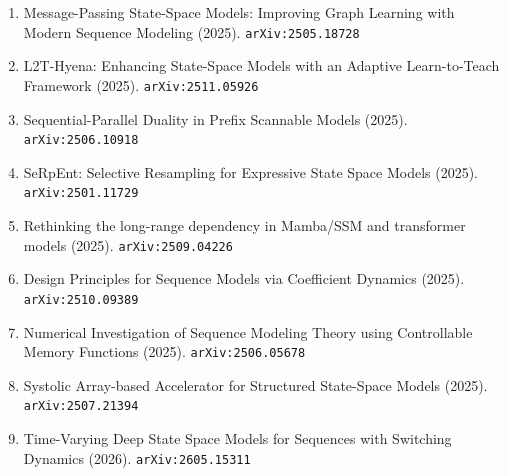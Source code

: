 \documentclass[11pt]{article}
\begin{document}
\begin{enumerate}
  \item Message-Passing State-Space Models: Improving Graph Learning with Modern Sequence Modeling (2025). \texttt{arXiv:2505.18728}
  \item L2T-Hyena: Enhancing State-Space Models with an Adaptive Learn-to-Teach Framework (2025). \texttt{arXiv:2511.05926}
  \item Sequential-Parallel Duality in Prefix Scannable Models (2025). \texttt{arXiv:2506.10918}
  \item SeRpEnt: Selective Resampling for Expressive State Space Models (2025). \texttt{arXiv:2501.11729}
  \item Rethinking the long-range dependency in Mamba/SSM and transformer models (2025). \texttt{arXiv:2509.04226}
  \item Design Principles for Sequence Models via Coefficient Dynamics (2025). \texttt{arXiv:2510.09389}
  \item Numerical Investigation of Sequence Modeling Theory using Controllable Memory Functions (2025). \texttt{arXiv:2506.05678}
  \item Systolic Array-based Accelerator for Structured State-Space Models (2025). \texttt{arXiv:2507.21394}
  \item Time-Varying Deep State Space Models for Sequences with Switching Dynamics (2026). \texttt{arXiv:2605.15311}
\end{enumerate}
\end{document}
